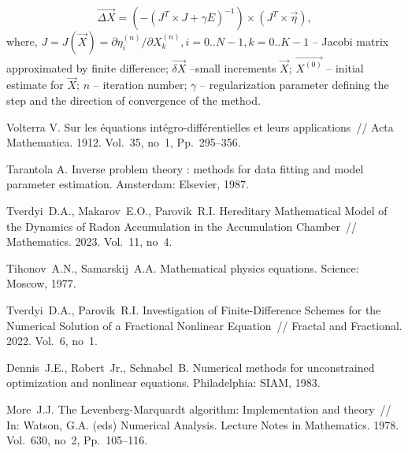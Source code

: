 \documentclass[12pt]{llncs}
\begin{document}
\begin{equation*}
	\overrightarrow{\Delta X} = \left( -\left( J^{T} \times J + \gamma E \right)^{-1} \right) \times \left(  J^{T} \times \overrightarrow{ \eta } \right),
\end{equation*}
where, $ J = J (\overrightarrow{X}) = \partial \eta_{i}^{(n)} / \partial X_{k}^{(n)}, i = 0..N-1, k = 0..K-1$ -- Jacobi matrix approximated by finite difference; $\overrightarrow{ \delta X }$ --small increments $\overrightarrow{X}$; $\overrightarrow{X^{(0)}}$ -- initial estimate for $\overrightarrow{X}$; $n$ -- iteration number; $\gamma$ -- regularization parameter defining the step and the direction of convergence of the method.


\begin{thebibliography}{9} %
	
	
	 Volterra V. Sur les {\'e}quations int{\'e}gro-diff{\'e}rentielles et leurs applications~// Acta Mathematica. 1912. Vol.~35, no~1, Pp.~295--356.
	
	 Tarantola A.	Inverse problem theory : methods for data fitting and model parameter estimation. Amsterdam: Elsevier, 1987.
	
	 Tverdyi~D.A., Makarov~E.O., Parovik~R.I. Hereditary Mathematical Model of the Dynamics of Radon Accumulation in the Accumulation Chamber~// Mathematics. 2023. Vol.~11, no~4.
	
	 Tihonov~A.N., Samarskij~A.A. Mathematical physics equations. Science: Moscow, 1977.
	
	 Tverdyi~D.A., Parovik~R.I. Investigation of Finite-Difference Schemes for the Numerical Solution of a Fractional Nonlinear Equation~// Fractal and Fractional. 2022. Vol.~6, no~1.
	
	 Dennis~J.E., Robert~Jr., Schnabel~B. Numerical methods for unconstrained optimization and nonlinear equations. Philadelphia: SIAM, 1983.
	
	
	 More~J.J. The Levenberg-Marquardt algorithm: Implementation and theory~// In: Watson, G.A. (eds) Numerical Analysis. Lecture Notes in Mathematics. 1978. Vol.~630, no~2, Pp.~105--116.
	
\end{thebibliography}
\end{document}
